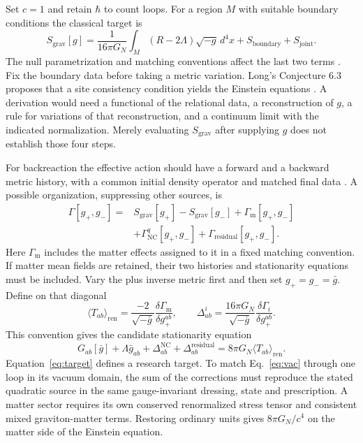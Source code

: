 \documentclass[11pt,letterpaper]{article}
\begin{document}
Set $c=1$ and retain $\hbar$ to count loops. For a region $M$ with suitable boundary conditions the classical target is
\[
 S_{\mathrm{grav}}[g]=\frac{1}{16\pi G_N}\int_M (R-2\Lambda)\sqrt{-g}\,d^4x
                 +S_{\mathrm{boundary}}+S_{\mathrm{joint}}.
\]
The null parametrization and matching conventions affect the last two terms \cite{nullaction}. Fix the boundary data before taking a metric variation. Long's Conjecture 6.3 proposes that a site consistency condition yields the Einstein equations \cite{long}. A derivation would need a functional of the relational data, a reconstruction of $g$, a rule for variations of that reconstruction, and a continuum limit with the indicated normalization. Merely evaluating $S_{\mathrm{grav}}$ after supplying $g$ does not establish those four steps.

For backreaction the effective action should have a forward and a backward metric history, with a common initial density operator and matched final data \cite{jordan}. A possible organization, suppressing other sources, is
\begin{align}
 \Gamma[g_+,g_-] ={}&
 S_{\mathrm{grav}}[g_+]-S_{\mathrm{grav}}[g_-]
   +\Gamma_{\mathrm{m}}[g_+,g_-] \nonumber\\
 &+\Gamma_{\mathrm{NC}}^{q}[g_+,g_-]
   +\Gamma_{\mathrm{residual}}[g_+,g_-].                 \label{eq:action}
\end{align}
Here $\Gamma_{\mathrm{m}}$ includes the matter effects assigned to it in a fixed matching convention. If matter mean fields are retained, their two histories and stationarity equations must be included. Vary the plus inverse metric first and then set $g_+=g_-=\bar g$. Define on that diagonal
\[
 \langle T_{ab}\rangle_{\mathrm{ren}}
  =\frac{-2}{\sqrt{-\bar g}}\frac{\delta\Gamma_{\mathrm{m}}}{\delta g_+^{ab}},
 \qquad
 \Delta^{i}_{ab}=\frac{16\pi G_N}{\sqrt{-\bar g}}
                             \frac{\delta\Gamma_i}{\delta g_+^{ab}} .
\]
This convention gives the candidate stationarity equation
\begin{equation}
 G_{ab}[\bar g]+\Lambda\bar g_{ab}
 +\Delta^{\mathrm{NC}}_{ab}+\Delta^{\mathrm{residual}}_{ab}
 =8\pi G_N\langle T_{ab}\rangle_{\mathrm{ren}}.           \label{eq:target}
\end{equation}
Equation~\eqref{eq:target} defines a research target. To match Eq.~\eqref{eq:vac} through one loop in its vacuum domain, the sum of the corrections must reproduce the stated quadratic source in the same gauge-invariant dressing, state and prescription. A matter sector requires its own conserved renormalized stress tensor and consistent mixed graviton-matter terms. Restoring ordinary units gives $8\pi G_N/c^4$ on the matter side of the Einstein equation.
\end{document}
